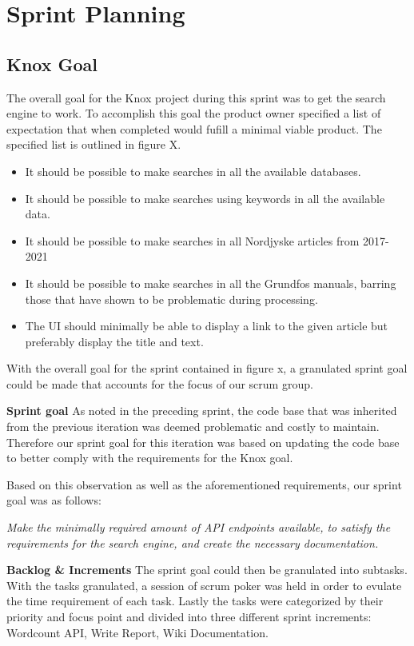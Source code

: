 \section{Sprint Planning}
\subsection{Knox Goal}
The overall goal for the Knox project during this sprint was to get the search engine to work. To accomplish this goal the product owner specified a list of expectation that when completed would fufill a minimal viable product. The specified list is outlined in figure X.
\begin{itemize}
	\item It should be possible to make searches in all the available databases.
	\item It should be possible to make searches using keywords in all the available data.
	\item It should be possible to make searches in all Nordjyske articles from 2017-2021
	\item It should be possible to make searches in all the Grundfos manuals, barring those that have shown to be problematic during processing.
	\item The UI should minimally be able to display a link to the given article but preferably display the title and text.
\end{itemize}

With the overall goal for the sprint contained in figure x, a granulated sprint goal could be made that accounts for the focus of our scrum group.


\textbf{Sprint goal}
As noted in the preceding sprint, the code base that was inherited from the previous iteration was deemed problematic and costly to maintain. Therefore our sprint goal for this iteration was based on updating the code base to better comply with the requirements for the Knox goal.


Based on this observation as well as the aforementioned requirements, our sprint goal was as follows:


\textit{Make the minimally required amount of API endpoints available, to satisfy the requirements for the search engine, and create the necessary documentation.}


\textbf{Backlog \& Increments}
The sprint goal could then be granulated into subtasks. With the tasks granulated, a session of scrum poker was held in order to evulate the time requirement of each task. Lastly the tasks were categorized by their priority and focus point and divided into three different sprint increments: Wordcount API, Write Report, Wiki Documentation. 


